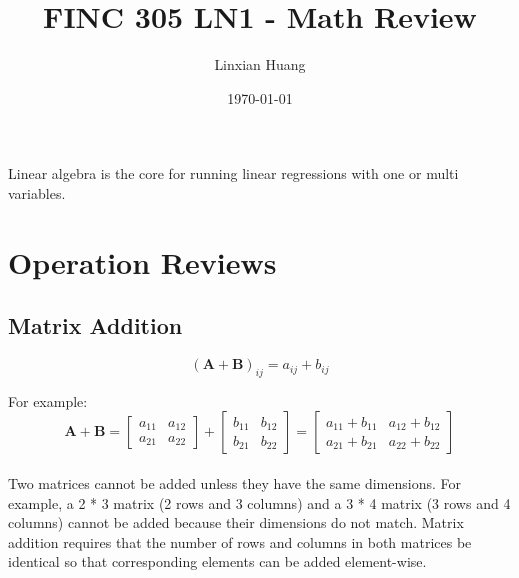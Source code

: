 \documentclass[11pt]{article}
\title{FINC 305 LN1 - Math Review}
\author{Linxian Huang}
\date{\today}
\begin{document}
\maketitle

    Linear algebra is the core for running linear regressions with one or multi variables. \\
\section{Operation Reviews}

    \subsection{Matrix Addition}

    \[
(\mathbf{A} + \mathbf{B})_{ij} = a_{ij} + b_{ij}
\]

For example:
    \[
\mathbf{A} + \mathbf{B} =
\begin{bmatrix}
a_{11} & a_{12} \\
a_{21} & a_{22}
\end{bmatrix}
+
\begin{bmatrix}
b_{11} & b_{12} \\
b_{21} & b_{22}
\end{bmatrix}
=
\begin{bmatrix}
a_{11} + b_{11} & a_{12} + b_{12} \\
a_{21} + b_{21} & a_{22} + b_{22}
\end{bmatrix}
\]
\\
    Two matrices cannot be added unless they have the same dimensions.
For example, a 2 * 3 matrix (2 rows and 3 columns) and a 3 * 4 matrix (3 rows and 4 columns) cannot be added because their dimensions do not match.
    Matrix addition requires that the number of rows and columns in both matrices be identical so that corresponding elements can be added element-wise.
\end{document}
